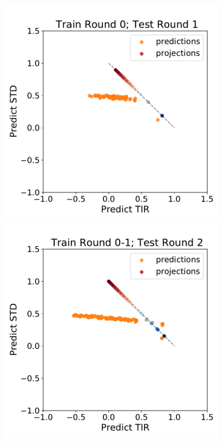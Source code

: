    
\begin{figure}[!ht]
   \centering
    \includegraphics[scale=0.35]{plots/Supplementary/proj_scatter_abc1_FF_0.pdf}
    \includegraphics[scale=0.35]{plots/Supplementary/proj_scatter_abc1_FF_1.pdf}

\end{figure}
